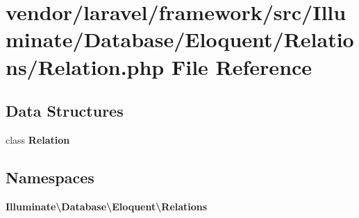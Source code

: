 \section{vendor/laravel/framework/src/\+Illuminate/\+Database/\+Eloquent/\+Relations/\+Relation.php File Reference}
\label{_relation_8php}
\subsection*{Data Structures}
\begin{DoxyCompactItemize}
\item 
class {\bf Relation}
\end{DoxyCompactItemize}
\subsection*{Namespaces}
\begin{DoxyCompactItemize}
\item 
 {\bf Illuminate\textbackslash{}\+Database\textbackslash{}\+Eloquent\textbackslash{}\+Relations}
\end{DoxyCompactItemize}
